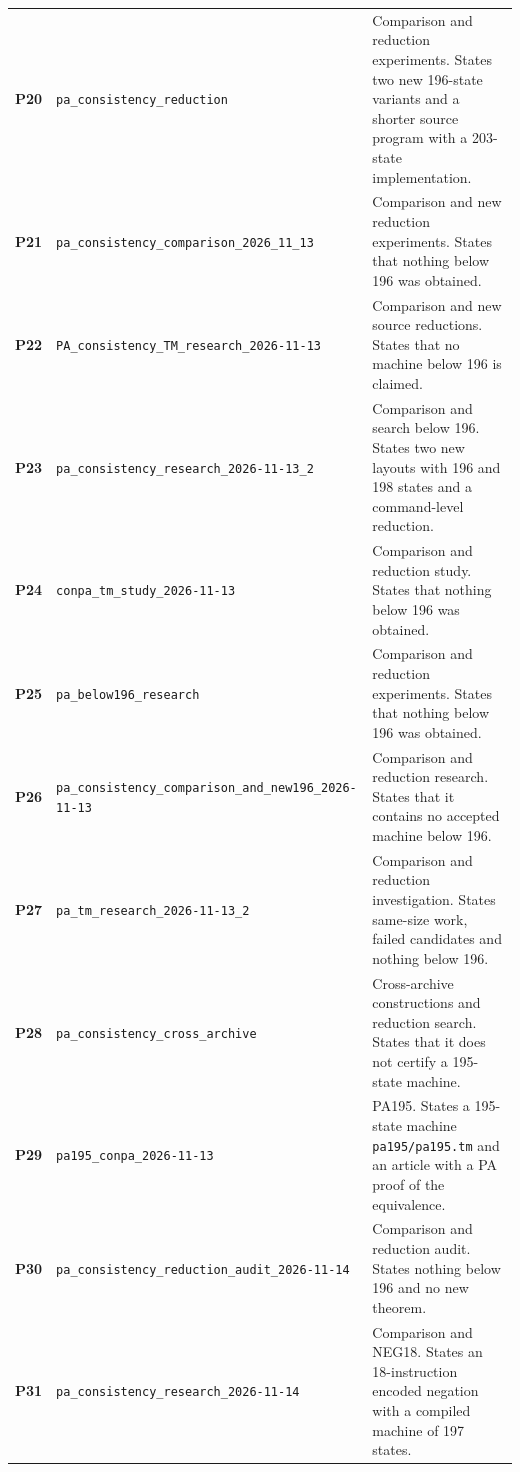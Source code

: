 \begin{longtable}{@{}>{\raggedright\arraybackslash}p{.055\linewidth}>{\raggedright\arraybackslash}p{.355\linewidth}>{\raggedright\arraybackslash}p{.55\linewidth}@{}}
\hypertarget{packet-P20}{\textbf{P20}} & \nolinkurl{pa_consistency_reduction} & Comparison and reduction experiments. States two new 196-state variants and a shorter source program with a 203-state implementation.\\[3pt]
\hypertarget{packet-P21}{\textbf{P21}} & \nolinkurl{pa_consistency_comparison_2026_11_13} & Comparison and new reduction experiments. States that nothing below 196 was obtained.\\[3pt]
\hypertarget{packet-P22}{\textbf{P22}} & \nolinkurl{PA_consistency_TM_research_2026-11-13} & Comparison and new source reductions. States that no machine below 196 is claimed.\\[3pt]
\hypertarget{packet-P23}{\textbf{P23}} & \nolinkurl{pa_consistency_research_2026-11-13_2} & Comparison and search below 196. States two new layouts with 196 and 198 states and a command-level reduction.\\[3pt]
\hypertarget{packet-P24}{\textbf{P24}} & \nolinkurl{conpa_tm_study_2026-11-13} & Comparison and reduction study. States that nothing below 196 was obtained.\\[3pt]
\hypertarget{packet-P25}{\textbf{P25}} & \nolinkurl{pa_below196_research} & Comparison and reduction experiments. States that nothing below 196 was obtained.\\[3pt]
\hypertarget{packet-P26}{\textbf{P26}} & \nolinkurl{pa_consistency_comparison_and_new196_2026-11-13} & Comparison and reduction research. States that it contains no accepted machine below 196.\\[3pt]
\hypertarget{packet-P27}{\textbf{P27}} & \nolinkurl{pa_tm_research_2026-11-13_2} & Comparison and reduction investigation. States same-size work, failed candidates and nothing below 196.\\[3pt]
\hypertarget{packet-P28}{\textbf{P28}} & \nolinkurl{pa_consistency_cross_archive} & Cross-archive constructions and reduction search. States that it does not certify a 195-state machine.\\[3pt]
\hypertarget{packet-P29}{\textbf{P29}} & \nolinkurl{pa195_conpa_2026-11-13} & PA195. States a 195-state machine \nolinkurl{pa195/pa195.tm} and an article with a PA proof of the equivalence.\\[3pt]
\hypertarget{packet-P30}{\textbf{P30}} & \nolinkurl{pa_consistency_reduction_audit_2026-11-14} & Comparison and reduction audit. States nothing below 196 and no new theorem.\\[3pt]
\hypertarget{packet-P31}{\textbf{P31}} & \nolinkurl{pa_consistency_research_2026-11-14} & Comparison and NEG18. States an 18-instruction encoded negation with a compiled machine of 197 states.\\[3pt]

\end{longtable}
